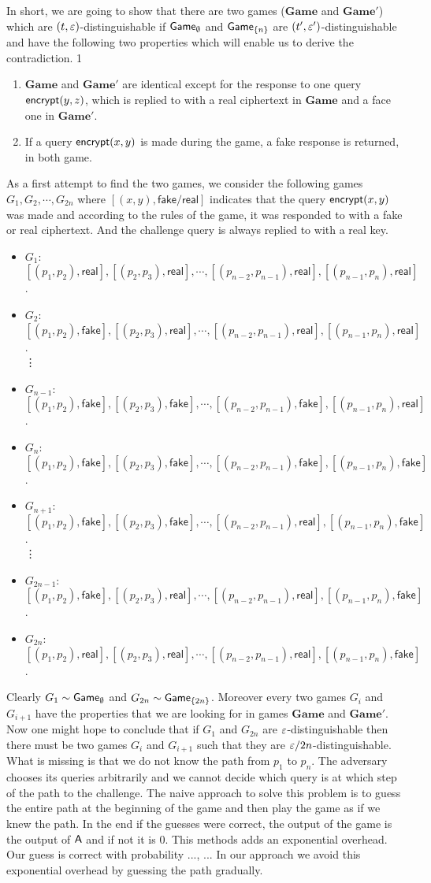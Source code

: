 \documentclass{article}
\def\A{{\sf A}}
\newcommand{\encrypt}{{\sf encrypt}}
\newcommand{\game}{{\sf Game}}
\newcommand{\dgame}{{\mathbf{Game}}}
\newcommand{\real}{{\mathsf {real}}}
\newcommand{\fake}{{\mathsf {fake}}}
\def\vaa{0}
\newcommand{\qF}[2]{\left[ (p_{#1},p_{#2}), \fake\right]}
\newcommand{\qR}[2]{\left[ (p_{#1},p_{#2}), \real\right]}
\begin{document}
  In short, we are going to show that there are two games ($\dgame$ and $\dgame'$) which are $(t,\varepsilon)$-distinguishable if $\game_{\emptyset}$ and $\game_{\cub{n}}$ are $(t',\varepsilon')$-distinguishable and have the following two properties which will enable us to derive the contradiction. 
\if\vaa1
\begin{enumerate}[Property 1.]
 \item $\dgame$ and $\dgame'$ are identical except for the response to one query $\encrypt(y,z)$, which is replied to with a real ciphertext in $\dgame$ and a face one in $\dgame'$.
 \item If a query $\encrypt(x,y)$ is made during the game, a fake response is returned, in both game.
 \end{enumerate}
 \fi
 As a first attempt to find the two games, we consider the following games $G_1, G_2, \cdots, G_{2n}$ where $[(x,y), {\mathsf{fake/real}}]$ indicates that the query $\encrypt(x,y)$ was made and according to the rules of the game, it was responded to with a fake or real ciphertext. And the challenge query is always replied to with a real key. 
 
 \begin{itemize}
\item $G_1$:$\qR{1}{2},\qR{2}{3}, \cdots,\qR{n-2}{n-1},\qR{n-1}{n}$.
\item $G_2$:$\qF{1}{2},\qR{2}{3}, \cdots,\qR{n-2}{n-1},\qR{n-1}{n}$.\\
 \vdots
\item $G_{n-1}$:$\qF{1}{2},\qF{2}{3}, \cdots,\qF{n-2}{n-1},\qR{n-1}{n}$.
\item $G_{n}$:$\qF{1}{2},\qF{2}{3}, \cdots,\qF{n-2}{n-1},\qF{n-1}{n}$.
\item $G_{n+1}$:$\qF{1}{2},\qF{2}{3}, \cdots,\qR{n-2}{n-1},\qF{n-1}{n}$.\\
 \vdots
\item $G_{2n-1}$:$\qF{1}{2},\qR{2}{3}, \cdots,\qR{n-2}{n-1},\qF{n-1}{n}$.
\item $G_{2n}$:$\qR{1}{2},\qR{2}{3}, \cdots,\qR{n-2}{n-1},\qF{n-1}{n}$.
 \end{itemize}

\noindent Clearly $G_1 \sim \game_{\emptyset}$ and $G_{2n}\sim\game_{\cub{2n}}$. Moreover every two games $G_i$ and $G_{i+1}$ have the properties that we are looking for in games $\dgame$ and $\dgame'$. Now one might hope to conclude that if $G_1$ and $G_{2n}$ are $\varepsilon$-distinguishable then there must be two games $G_i$ and $G_{i+1}$ such that they are $\varepsilon/2n$-distinguishable. What is missing is that we do not know the path from $p_1$ to $p_n$. The adversary chooses its queries arbitrarily and we cannot decide which query is at which step of the path to the challenge. The naive approach to solve this problem is to guess the entire path at the beginning of the game and then play the game as if we knew the path. In the end if the guesses were correct, the output of the game is the output of $\A$ and if not it is 0. This methods adds an exponential overhead. Our guess is correct with probability ..., ... In our approach we avoid this exponential overhead by guessing the path gradually.\\
\end{document}
